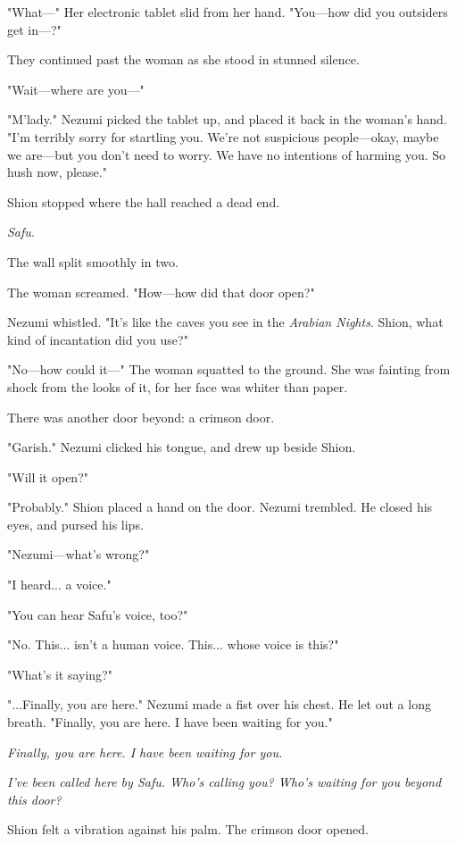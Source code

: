 "What---" Her electronic tablet slid from her hand. "You---how did you
outsiders get in---?"

They continued past the woman as she stood in stunned silence.

"Wait---where are you---"

"M'lady." Nezumi picked the tablet up, and placed it back in the woman's
hand. "I'm terribly sorry for startling you. We're not suspicious
people---okay, maybe we are---but you don't need to worry. We have no
intentions of harming you. So hush now, please."

Shion stopped where the hall reached a dead end.

\emph{Safu.}

The wall split smoothly in two.

The woman screamed. "How---how did that door open?"

Nezumi whistled. "It's like the caves you see in the \emph{Arabian Nights}.
Shion, what kind of incantation did you use?"

"No---how could it---" The woman squatted to the ground. She was fainting
from shock from the looks of it, for her face was whiter than paper.

There was another door beyond: a crimson door.

"Garish." Nezumi clicked his tongue, and drew up beside Shion.~

"Will it open?"

"Probably." Shion placed a hand on the door. Nezumi trembled. He closed
his eyes, and pursed his lips.

"Nezumi---what's wrong?"

"I heard... a voice."

"You can hear Safu's voice, too?"

"No. This... isn't a human voice. This... whose voice is this?"

"What's it saying?"

"...Finally, you are here." Nezumi made a fist over his chest. He let
out a long breath. "Finally, you are here. I have been waiting for you."

\emph{Finally, you are here. I have been waiting for you.}

\myspace

\emph{I've been called here by Safu. Who's calling you? Who's waiting for you
beyond this door?}

Shion felt a vibration against his palm. The crimson door opened.

